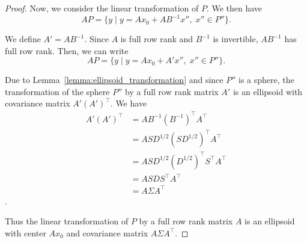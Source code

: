 \documentclass[10pt,a4paper]{amsart}
\begin{document}
\begin{proof}
	Now, we consider the linear transformation of \(P\).
	We then have 
	\[
	A P = \{y \;\vert\; y = A x_0 + A B^{-1}x'',\; x'' \in P''\}.	
	\]

	We define \(A' = A B^{-1}\). Since \(A\) is full row rank and \(B^{-1}\) is invertible, \(A B^{-1}\) has full row rank.
	Then, we can write
	\[
	A P = \{y \;\vert\; y = A x_0 + A' x'',\; x'' \in P''\}.	
	\]

	Due to Lemma~\ref{lemma:ellipsoid_transformation} and since \(P''\) is a sphere, the transformation of the sphere \(P''\) by a full row rank matrix \(A'\) is an ellipsoid with covariance matrix \(A' (A')^{\top}\).
	We have 
	\begin{align*}
		A' (A')^{\top} &= A B^{-1} (B^{-1})^{\top}A^{\top}\\
		&= A S D^{1/2} (S D^{1/2})^{\top}A^{\top}\\
		&= A S D^{1/2}  (D^{1/2})^{\top}S^{\top} A^{\top}\\
		&= A S D S^{\top} A^{\top}\\
		&= A \Sigma A^{\top}
	\end{align*}.

	Thus the linear transformation of \(P\) by a full row rank matrix \(A\) is an ellipsoid with center \(A x_0\) and covariance matrix \(A \Sigma A^{\top}\).
\end{proof}
\end{document}
